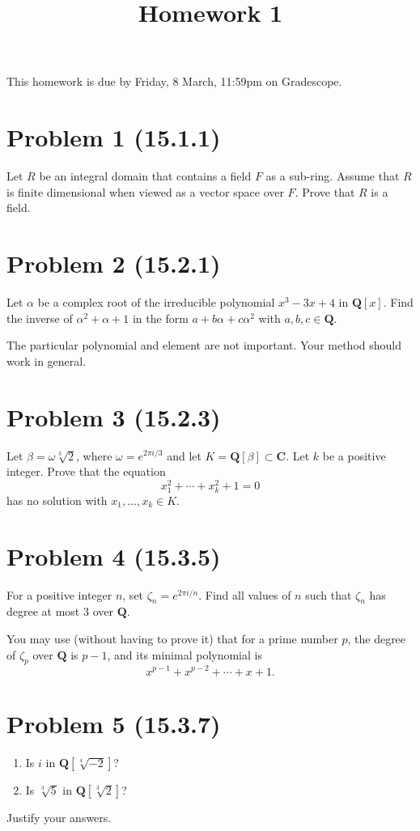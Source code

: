 \documentclass{amsart}
\date{}
\title{Homework 1}
\begin{document}
\maketitle
This homework is due by Friday, 8 March, 11:59pm on Gradescope.

\section{Problem 1 (15.1.1)}
\label{sec:org432eea8}
Let \(R\) be an integral domain that contains a field \(F\) as a sub-ring.
Assume that \(R\) is finite dimensional when viewed as a vector space over \(F\).
Prove that \(R\) is a field.

\section{Problem 2 (15.2.1)}
\label{sec:orgaa49816}
Let \(\alpha\) be a complex root of the irreducible polynomial \(x^{3}-3x+4\) in \(\mathbf{Q}[x]\).
Find the inverse of \(\alpha^2+\alpha+1\) in the form \(a + b \alpha + c \alpha^{2}\) with \(a, b, c \in \mathbf{Q}\).

The particular polynomial and element are not important.
Your method should work in general.


\section{Problem 3 (15.2.3)}
\label{sec:orgebd0f58}
Let \(\beta = \omega \sqrt[3]{2}\), where \(\omega = e^{2\pi i / 3}\) and let \(K = \mathbf{Q}[\beta] \subset \mathbf{C}\).
Let \(k\) be a positive integer.
Prove that the equation
\[ x_1^2 + \cdots + x_k^2 + 1 = 0\]
has no solution with \(x_1, \dots, x_{k} \in K\).


\section{Problem 4 (15.3.5)}
\label{sec:org842ae42}
For a positive integer \(n\), set \(\zeta_{n} = e^{2\pi i / n}\).
Find all values of \(n\) such that \(\zeta_{n}\) has degree at most 3 over \(\mathbf{Q}\).

You may use (without having to prove it) that for a prime number \(p\), the degree of \(\zeta_p\) over \(\mathbf{Q}\) is \(p-1\), and its minimal polynomial is
\[x^{p-1}+ x^{p-2} + \cdots + x + 1.\]

\section{Problem 5 (15.3.7)}
\label{sec:org94b1007}
\begin{enumerate}
\item Is \(i\) in \(\mathbf{Q}[\sqrt[4]{-2}]\)?
\item Is \(\sqrt[3]5\) in \(\mathbf{Q}[\sqrt[3]2]\)?
\end{enumerate}

Justify your answers.
\end{document}
